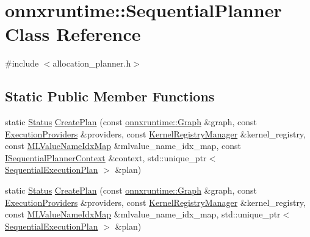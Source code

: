 \hypertarget{classonnxruntime_1_1SequentialPlanner}{}\section{onnxruntime\+:\+:Sequential\+Planner Class Reference}
\label{classonnxruntime_1_1SequentialPlanner}


{\ttfamily \#include $<$allocation\+\_\+planner.\+h$>$}

\subsection*{Static Public Member Functions}
\begin{DoxyCompactItemize}
\item 
static \mbox{\hyperlink{classonnxruntime_1_1common_1_1Status}{Status}} \mbox{\hyperlink{classonnxruntime_1_1SequentialPlanner_acd289ccfd038947aff6312fd8ab53a71}{Create\+Plan}} (const \mbox{\hyperlink{classonnxruntime_1_1Graph}{onnxruntime\+::\+Graph}} \&graph, const \mbox{\hyperlink{classonnxruntime_1_1ExecutionProviders}{Execution\+Providers}} \&providers, const \mbox{\hyperlink{classonnxruntime_1_1KernelRegistryManager}{Kernel\+Registry\+Manager}} \&kernel\+\_\+registry, const \mbox{\hyperlink{classonnxruntime_1_1MLValueNameIdxMap}{M\+L\+Value\+Name\+Idx\+Map}} \&mlvalue\+\_\+name\+\_\+idx\+\_\+map, const \mbox{\hyperlink{classonnxruntime_1_1ISequentialPlannerContext}{I\+Sequential\+Planner\+Context}} \&context, std\+::unique\+\_\+ptr$<$ \mbox{\hyperlink{structonnxruntime_1_1SequentialExecutionPlan}{Sequential\+Execution\+Plan}} $>$ \&plan)
\item 
static \mbox{\hyperlink{classonnxruntime_1_1common_1_1Status}{Status}} \mbox{\hyperlink{classonnxruntime_1_1SequentialPlanner_af1a4a3cddff791ac7677d7c70ea7e64d}{Create\+Plan}} (const \mbox{\hyperlink{classonnxruntime_1_1Graph}{onnxruntime\+::\+Graph}} \&graph, const \mbox{\hyperlink{classonnxruntime_1_1ExecutionProviders}{Execution\+Providers}} \&providers, const \mbox{\hyperlink{classonnxruntime_1_1KernelRegistryManager}{Kernel\+Registry\+Manager}} \&kernel\+\_\+registry, const \mbox{\hyperlink{classonnxruntime_1_1MLValueNameIdxMap}{M\+L\+Value\+Name\+Idx\+Map}} \&mlvalue\+\_\+name\+\_\+idx\+\_\+map, std\+::unique\+\_\+ptr$<$ \mbox{\hyperlink{structonnxruntime_1_1SequentialExecutionPlan}{Sequential\+Execution\+Plan}} $>$ \&plan)
\end{DoxyCompactItemize}


